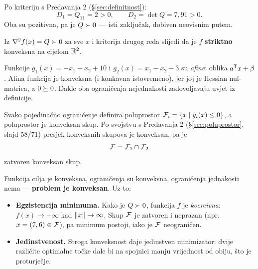 \begin{korak}
Po kriteriju s Predavanja 2 (\S\ref{sec:definitnost}):
\begin{equation}
D_1 = Q_{11} = 2 > 0, \qquad
D_2 = \det Q = 7{,}91 > 0 .
\end{equation}
Oba su pozitivna, pa je $Q \succ 0$ --- isti zaključak, dobiven neovisnim putem.
\end{korak}

\begin{korak}
Iz $\nabla^2 f(x) = Q \succ 0$ za sve $x$ i kriterija drugog reda slijedi da je $f$
\textbf{striktno} konveksna na cijelom $\mathbb{R}^2$.
\end{korak}

\begin{korak}
Funkcije $g_1(x) = -x_1 - x_2 + 10$ i $g_2(x) = x_1 - x_2 - 3$ su \emph{afine}:
oblika $a^{\mathsf{T}} x + \beta$. Afina funkcija je konveksna (i konkavna istovremeno),
jer joj je Hessian nul-matrica, a $0 \succeq 0$. Dakle oba ograničenja nejednakosti
zadovoljavaju uvjet iz definicije.
\end{korak}

\begin{korak}
Svako pojedinačno ograničenje definira poluprostor
$\mathcal{F}_i = \{x \mid g_i(x) \leq 0\}$, a poluprostor je konveksan skup. Po svojstvu
s Predavanja 2 (\S\ref{sec:poluprostor}, slajd 58/71) presjek konveksnih skupova
je konveksan, pa je
\begin{equation}
\mathcal{F} = \mathcal{F}_1 \cap \mathcal{F}_2
\end{equation}
zatvoren konveksan skup.
\end{korak}

\begin{korak}
Funkcija cilja je konveksna, ograničenja su konveksna, ograničenja jednakosti
nema --- \textbf{problem je konveksan}. Uz to:
\begin{itemize}[leftmargin=*]
  \item \textbf{Egzistencija minimuma.} Kako je $Q \succ 0$, funkcija $f$ je
        \emph{koercivna}: $f(x) \to +\infty$ kad $\left\lVert x \right\rVert \to \infty$. Skup
        $\mathcal{F}$ je zatvoren i neprazan (npr.\ $x = (7,6) \in \mathcal{F}$), pa minimum
        postoji, iako je $\mathcal{F}$ neograničen.
  \item \textbf{Jedinstvenost.} Stroga konveksnost daje jedinstven minimizator:
        dvije različite optimalne točke dale bi na spojnici manju vrijednost od
        obiju, što je proturječje.
\end{itemize}
\end{korak}

